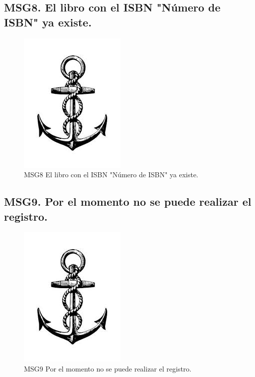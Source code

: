 \subsection{MSG8. El libro con el ISBN "Número de ISBN" ya existe.}
    \begin{figure}[htbp]
        \begin{center}
            \includegraphics[width=.4\textwidth]{images/MSG/ancla}
            \caption{MSG8 El libro con el ISBN "Número de ISBN" ya existe.}
            \label{fig:MSG8}
        \end{center}
    \end{figure}

\subsection{MSG9. Por el momento no se puede realizar el registro.}
    \begin{figure}[htbp]
        \begin{center}
            \includegraphics[width=.4\textwidth]{images/MSG/ancla}
            \caption{MSG9 Por el momento no se puede realizar el registro.}
            \label{fig:MSG9}
        \end{center}
    \end{figure}

